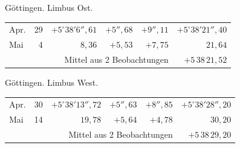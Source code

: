 \noindent\begin{minipage}[t]{.495\textwidth}\centering Göttingen. Limbus Ost.\par\smallskip
{\scriptsize\setlength{\tabcolsep}{1pt}\renewcommand{\arraystretch}{1.2}\begin{tabular}{lr|r|r|r|r|}
Apr.&29&$+5^\circ38'6''{,}61$&$+5''{,}68$&$+9''{,}11$&$+5^\circ38'21''{,}40$\\
Mai&4&$8{,}36$&$+5{,}53$&$+7{,}75$&$21{,}64$\\
\cline{6-6}\multicolumn{5}{r}{Mittel aus 2 Beobachtungen}&$+5\,38\,21{,}52$
\end{tabular}}\end{minipage}\hfill\begin{minipage}[t]{.495\textwidth}\centering Göttingen. Limbus West.\par\smallskip
{\scriptsize\setlength{\tabcolsep}{1pt}\renewcommand{\arraystretch}{1.2}\begin{tabular}{lr|r|r|r|r}
Apr.&30&$+5^\circ38'13''{,}72$&$+5''{,}63$&$+8''{,}85$&$+5^\circ38'28''{,}20$\\
Mai&14&$19{,}78$&$+5{,}64$&$+4{,}78$&$30{,}20$\\
\cline{6-6}\multicolumn{5}{r}{Mittel aus 2 Beobachtungen}&$+5\,38\,29{,}20$
\end{tabular}}\end{minipage}
\par\vspace{4mm}

